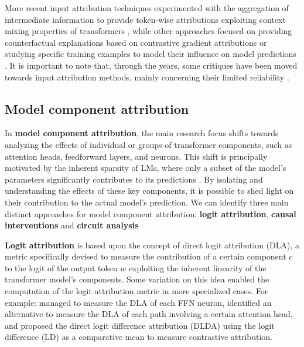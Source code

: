 More recent input attribution techniques experimented with the aggregation of intermediate information to provide token-wise attributions exploiting context mixing properties of transformers \cite{ferrando2022, modarressi2022, mohebbi2023}, while other approaches focused on providing counterfactual explanations based on contrastive gradient attributions \cite{yin2022} or studying specific training examples to model their influence on model predictions \cite{kwon2024, grosse2023}.
It is important to note that, through the years, some critiques have been moved towards input attribution methods, mainly concerning their limited reliability \cite{sixt2019, adebayo2018, atanasova2020}.

\subsection{Model component attribution}

In \textbf{model component attribution}, the main research focus shifts towards analyzing the effects of individual or groups of transformer components, such as attention heads, feedforward layers, and neurons.
This shift is principally motivated by the inherent sparsity of LMs, where only a subset of the model's parameters significantly contributes to its predictions .
By isolating and understanding the effects of these key components, it is possible to shed light on their contribution to the actual model's prediction.
We can identify three main distinct approaches for model component attribution: \textbf{logit attribution}, \textbf{causal interventions} and \textbf{circuit analysis}

\textbf{Logit attribution} is based upon the concept of direct logit attribution (DLA), a metric specifically devised to measure the contribution of a certain component $c$ to the logit of the output token $w$ exploiting the inherent linearity of the transformer model's components.
Some variation on this idea enabled the computation of the logit attribution metric in more specialized cases.
For example: \citet{geva2022} managed to measure the DLA of each FFN neuron, \citet{ferrando2023} identified an alternative to measure the DLA of each path involving a certain attention head, and \citet{wang2022} proposed the direct logit difference attribution (DLDA) using the logit difference (LD) as a comparative mean to measure contrastive attribution.

